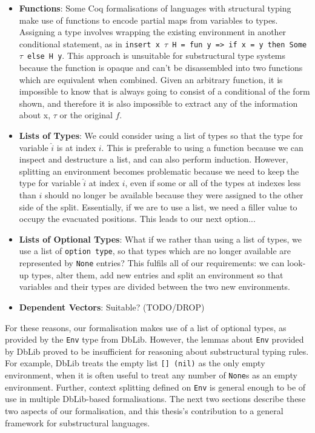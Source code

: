 \documentclass[]{unswthesis}
\let\c\texttt
\begin{document}
\begin{itemize}
\item \textbf{Functions}: Some Coq formalisations of languages with structural typing \cite{pierce15} make use of functions to encode partial maps from variables to types. Assigning a type involves wrapping the existing environment in another conditional statement, as in \c{insert x $\tau$ H = fun y => if x = y then Some $\tau$ else H y}. This approach is unsuitable for substructural type systems because the function is opaque and can't be disassembled into two functions which are equivalent when combined. Given an arbitrary function, it is impossible to know that is always going to consist of a conditional of the form shown, and therefore it is also impossible to extract any of the information about x, $\tau$ or the original $f$.
\item \textbf{Lists of Types}: We could consider using a list of types so that the type for variable $\hat{i}$ is at index $i$. This is preferable to using a function because we can inspect and destructure a list, and can also perform induction. However, splitting an environment becomes problematic because we need to keep the type for variable $\hat{i}$ at index $i$, even if some or all of the types at indexes less than $i$ should no longer be available because they were assigned to the other side of the split. Essentially, if we are to use a list, we need a filler value to occupy the evacuated positions. This leads to our next option...
\item \textbf{Lists of Optional Types}: What if we rather than using a list of types, we use a list of \c{option type}, so that types which are no longer available are represented by \c{None} entries? This fulfils all of our requirements: we can look-up types, alter them, add new entries and split an environment so that variables and their types are divided between the two new environments.
\item \textbf{Dependent Vectors}: Suitable? (TODO/DROP)
\end{itemize}

For these reasons, our formalisation makes use of a list of optional types, as provided by the \c{Env} type from DbLib. However, the lemmas about \c{Env} provided by DbLib proved to be insufficient for reasoning about substructural typing rules. For example, DbLib treats the empty list \c{[] (nil)} as the only empty environment, when it is often useful to treat any number of \c{None}s as an empty environment. Further, context splitting defined on \c{Env} is general enough to be of use in multiple DbLib-based formalisations. The next two sections describe these two aspects of our formalisation, and this thesis's contribution to a general framework for substructural languages.
\end{document}
